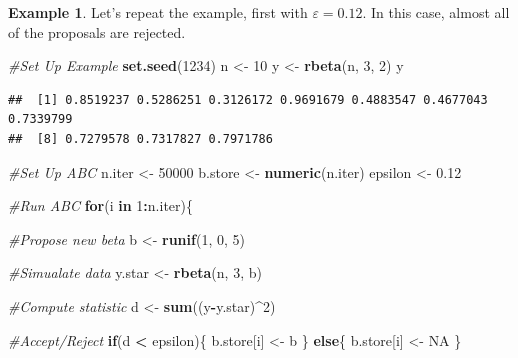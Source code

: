 \documentclass[
]{book}
\newenvironment{Shaded}{\begin{snugshade}}{\end{snugshade}}
\newcommand{\CommentTok}[1]{\textcolor[rgb]{0.56,0.35,0.01}{\textit{#1}}}
\newcommand{\ConstantTok}[1]{\textcolor[rgb]{0.56,0.35,0.01}{#1}}
\newcommand{\ControlFlowTok}[1]{\textcolor[rgb]{0.13,0.29,0.53}{\textbf{#1}}}
\newcommand{\DecValTok}[1]{\textcolor[rgb]{0.00,0.00,0.81}{#1}}
\newcommand{\FloatTok}[1]{\textcolor[rgb]{0.00,0.00,0.81}{#1}}
\newcommand{\FunctionTok}[1]{\textcolor[rgb]{0.13,0.29,0.53}{\textbf{#1}}}
\newcommand{\NormalTok}[1]{#1}
\newcommand{\OtherTok}[1]{\textcolor[rgb]{0.56,0.35,0.01}{#1}}
\newcommand{\SpecialCharTok}[1]{\textcolor[rgb]{0.81,0.36,0.00}{\textbf{#1}}}
\theoremstyle{definition}
\theoremstyle{definition}
\newtheorem{example}{Example}[chapter]
\theoremstyle{definition}
\theoremstyle{definition}
\theoremstyle{remark}
\begin{document}
\begin{example}

Let's repeat the example, first with \(\varepsilon = 0.12\). In this case, almost all of the proposals are rejected.

\begin{Shaded}
\begin{Highlighting}[]
\CommentTok{\#Set Up Example}
\FunctionTok{set.seed}\NormalTok{(}\DecValTok{1234}\NormalTok{)}
\NormalTok{n }\OtherTok{\textless{}{-}} \DecValTok{10}
\NormalTok{y }\OtherTok{\textless{}{-}} \FunctionTok{rbeta}\NormalTok{(n, }\DecValTok{3}\NormalTok{, }\DecValTok{2}\NormalTok{)}
\NormalTok{y}
\end{Highlighting}
\end{Shaded}

\begin{verbatim}
##  [1] 0.8519237 0.5286251 0.3126172 0.9691679 0.4883547 0.4677043 0.7339799
##  [8] 0.7279578 0.7317827 0.7971786
\end{verbatim}

\begin{Shaded}
\begin{Highlighting}[]
\CommentTok{\#Set Up ABC}
\NormalTok{n.iter }\OtherTok{\textless{}{-}} \DecValTok{50000}
\NormalTok{b.store }\OtherTok{\textless{}{-}} \FunctionTok{numeric}\NormalTok{(n.iter)}
\NormalTok{epsilon }\OtherTok{\textless{}{-}} \FloatTok{0.12}

\CommentTok{\#Run ABC}
\ControlFlowTok{for}\NormalTok{(i }\ControlFlowTok{in} \DecValTok{1}\SpecialCharTok{:}\NormalTok{n.iter)\{}
  
  \CommentTok{\#Propose new beta}
\NormalTok{  b }\OtherTok{\textless{}{-}} \FunctionTok{runif}\NormalTok{(}\DecValTok{1}\NormalTok{, }\DecValTok{0}\NormalTok{, }\DecValTok{5}\NormalTok{)}
  
  \CommentTok{\#Simualate data}
\NormalTok{  y.star }\OtherTok{\textless{}{-}} \FunctionTok{rbeta}\NormalTok{(n, }\DecValTok{3}\NormalTok{, b)}
  
  \CommentTok{\#Compute statistic}
\NormalTok{  d }\OtherTok{\textless{}{-}} \FunctionTok{sum}\NormalTok{((y}\SpecialCharTok{{-}}\NormalTok{y.star)}\SpecialCharTok{\^{}}\DecValTok{2}\NormalTok{)}
  
  \CommentTok{\#Accept/Reject}
  \ControlFlowTok{if}\NormalTok{(d }\SpecialCharTok{\textless{}}\NormalTok{ epsilon)\{}
\NormalTok{    b.store[i] }\OtherTok{\textless{}{-}}\NormalTok{ b}
\NormalTok{  \} }\ControlFlowTok{else}\NormalTok{\{}
\NormalTok{    b.store[i] }\OtherTok{\textless{}{-}} \ConstantTok{NA}
\NormalTok{  \}}
  

\end{Highlighting}
\end{Shaded}
\end{example}
\end{document}

